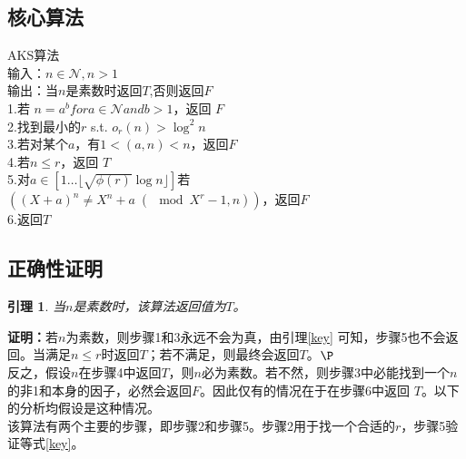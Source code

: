 \documentclass[a4paper,notitlepage]{article}
\newtheorem{lemma}{引理}[section]
\numberwithin{equation}{section}
\begin{document}
\begin{multicols}{2}
  \subsection{核心算法}\label{sec_r1}
  \begin{boxedminipage}{\columnwidth}
    AKS算法\\
    输入：$n\in\mathcal{N},n>1$\\
    输出：当$n$是素数时返回$T$,否则返回$F$\\
    1.\quad 若 $n=a^b for a\in\mathcal{N} and b>1$，返回 $F$\\
    2.\quad 找到最小的$r$ s.t. $o_r (n)>\log^2 n$\\
    3.\quad 若对某个$a$，有$1<(a,n)<n$，返回$F$\\
    4.\quad 若$n\le r$，返回 $T$\\
    5.\quad 对$a\in\left[1\ldots\lfloor\sqrt{\phi (r)}\log n\rfloor\right]$若\\
    \indent\quad$\left((X+a)^n\ne X^n+a\;(\!\!\!\!\!\mod X^r-1,n)\right)$，返回$F$\\
    6.\quad 返回$T$
  \end{boxedminipage}
  \subsection{正确性证明}
  \begin{lemma}\label{pp}
    \upshape 当$n$是素数时，该算法返回值为$T$。
  \end{lemma}
  \textbf{证明：}若$n$为素数，则步骤1和3永远不会为真，由引理\ref{key} 可知，步骤5也不会返回。当满足$n\le
  r$时返回$T$；若不满足，则最终会返回$T$。$\P$\\[.2cm]
  反之，假设$n$在步骤4中返回$T$，则$n$必为素数。若不然，则步骤3中必能找到一个$n$的非1和本身的因子，必然会返回$F$。因此仅有的情况在于在步骤6中返回
  $T$。以下的分析均假设是这种情况。\\
  该算法有两个主要的步骤，即步骤2和步骤5。步骤2用于找一个合适的$r$，步骤5验证等式\ref{key}。


\end{multicols}
\end{document}
